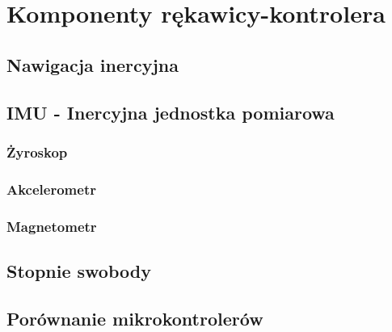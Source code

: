 \chapter{Komponenty rękawicy-kontrolera}
\label{ch:komponenty}

	\section{Nawigacja inercyjna}
	\label{sec:inercja}
	
	
	\section{IMU - Inercyjna jednostka pomiarowa}
	\label{sec:imu}
	
		\subsection{Żyroskop}
		\label{subsec:gyro}
		
		\subsection{Akcelerometr}
		\label{subsec:acc}
		
		\subsection{Magnetometr}
		\label{subsec:mag}
	
	\section{Stopnie swobody}
	\label{sec:swobody}	
	
	\section{Porównanie mikrokontrolerów}
	\label{sec:mikrokontrolery}
	